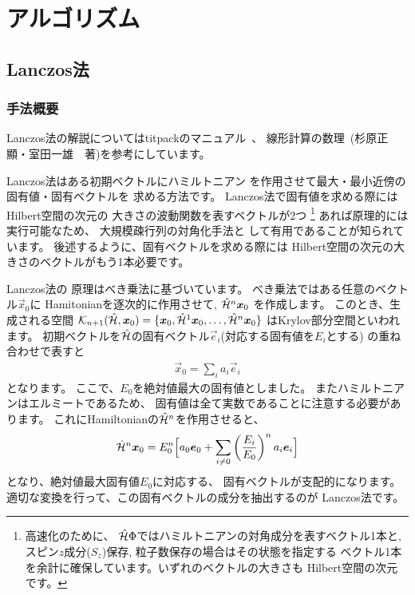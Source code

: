 \chapter{アルゴリズム}
\label{Ch:algorithm}
\section{Lanczos法}
\label{Ch:Lanczos}
\subsection{手法概要}
Lanczos法の解説についてはtitpackのマニュアル~\cite{titpack}、
線形計算の数理~\cite{SugiharaMurota}(杉原正顯・室田一雄　著)を参考にしています。

Lanczos法はある初期ベクトルにハミルトニアン
を作用させて最大・最小近傍の固有値・固有ベクトルを
求める方法です。
Lanczos法で固有値を求める際にはHilbert空間の次元の
大きさの波動関数を表すベクトルが2つ
\footnote{高速化のために、
$\hat{\mathcal{H}}\Phi$ではハミルトニアンの対角成分を表すベクトル1本と,
スピン$z$成分($S_{z}$)保存, 粒子数保存の場合はその状態を指定する
ベクトル1本を余計に確保しています。いずれのベクトルの大きさも
Hilbert空間の次元です。}
あれば原理的には実行可能なため、
大規模疎行列の対角化手法と
して有用であることが知られています。
後述するように、固有ベクトルを求める際には
Hilbert空間の次元の大きさのベクトルがもう1本必要です。

Lanczos法の
原理はべき乗法に基づいています。
べき乗法ではある任意のベクトル$\vec{x}_{0}$に
Hamitonianを逐次的に作用させて, $\hat{\mathcal{H}}^{n}\boldsymbol x_{0}$
を作成します。
このとき、生成される空間
$\mathcal{K}_{n+1}(\hat{\mathcal{H}},\boldsymbol x_{0})=\{\boldsymbol x_{0},\hat{\mathcal{H}}^{1}\boldsymbol x_{0},\dots,\hat{\mathcal{H}}^{n}\boldsymbol x_{0}\}$
はKrylov部分空間といわれます。
初期ベクトルを$\hat{\mathcal{H}}$の固有ベクトル$\vec{e}_{i}$(対応する固有値を$E_{i}$とする)
の重ね合わせで表すと
\begin{align}
\vec{x}_{0}=\sum_{i}a_{i}\vec{e}_{i}
\end{align}
となります。
ここで、$E_{0}$を絶対値最大の固有値としました。
またハミルトニアンはエルミートであるため、
固有値は全て実数であることに注意する必要があります。
これにHamiltonianの$\hat{\mathcal{H}}^{n}$を作用させると、
\begin{align}
\hat{\mathcal{H}}^{n}\boldsymbol x_{0}=E_{0}^{n}\Big[ a_{0}\boldsymbol e_{0}+\sum_{i\neq0}\left(\frac{E_{i}}{E_{0}}\right)^na_{i}\boldsymbol e_{i}\Big]
\end{align}
となり、絶対値最大固有値$E_{0}$に対応する、
固有ベクトルが支配的になります。
適切な変換を行って、この固有ベクトルの成分を抽出するのが
Lanczos法です。

